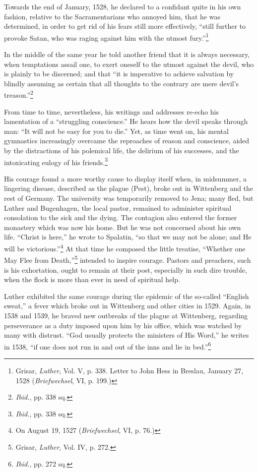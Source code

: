 Towards the end of January, 1528, he declared to a confidant quite
in his own fashion, relative to the Sacramentarians who annoyed him,
that he was determined, in order to get rid of his fears still more
effectively, “still further to provoke Satan, who was raging against
him with the utmost fury.”\footnote
{Grisar, \textit{Luther}, Vol. V, p. 338. Letter to John Hess in Breslau, January 27, 1528
(\textit{Briefwechsel}, VI, p. 199.)}

In the middle of the same year he told another friend that it is
always necessary, when temptations assail one, to exert oneself to the
utmost against the devil, who is plainly to be discerned; and that
“it is imperative to achieve salvation by blindly assuming as certain
that all thoughts to the contrary are mere devil’s treason.”\footnote{\textit{Ibid.}, pp. 338 sq.}

From time to time, nevertheless, his writings and addresses re-echo
his lamentation of a “struggling conscience.” He hears how the devil
speaks through man: “It will not be easy for you to die.” Yet, as
time went on, his mental gymnastics increasingly overcame the reproaches
of reason and conscience, aided by the distractions of his
polemical life, the delirium of his successes, and the intoxicating
eulogy of his friends.\footnote{\textit{Ibid.}, pp. 338 sq.}

His courage found a more worthy cause to display itself when, in
midsummer, a lingering disease, described as the plague (Pest), broke
out in Wittenberg and the rest of Germany. The university was
temporarily removed to Jena; many fled, but Luther and Bugenhagen,
the local pastor, remained to administer spiritual consolation
to the sick and the dying. The contagion also entered the former
monastery which was now his home. But he was not concerned about his own life.
“Christ is here,” he wrote to Spalatin, “so that we may not be alone; and He
will be victorious.”\footnote{On August 19, 1527 (\textit{Briefwechsel}, VI, p.
76.)} At that time he composed the little treatise, “Whether one May Flee from
Death,”\footnote{Grisar, \textit{Luther}, Vol. IV, p. 272.}
intended to inspire courage. Pastors and preachers, such is his exhortation,
ought to remain at their post, especially in such dire
trouble, when the flock is more than ever in need of spiritual help.

Luther exhibited the same courage during the epidemic of the so-called
“English sweat,” a fever which broke out in Wittenberg and
other cities in 1529. Again, in 1538 and 1539, he braved new outbreaks
of the plague at Wittenberg, regarding perseverance as a duty
imposed upon him by his office, which was watched by many with distrust.
“God usually protects the ministers of His Word,” he writes in
1538, “if one does not run in and out of the inns and lie in bed.”\footnote{\textit{Ibid.}, pp. 272 sq.}

